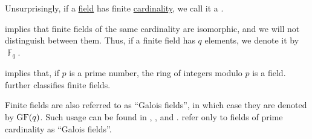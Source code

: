 \begin{definition}\label{def:finite_field}\mimprovised
  Unsurprisingly, if a \hyperref[def:field]{field} has finite \hyperref[thm:cardinality_existence]{cardinality}, we call it a .

   implies that finite fields of the same cardinality are isomorphic, and we will not distinguish between them. Thus, if a finite field has \( q \) elements, we denote it by \( \BbbF_q \).
\end{definition}
\begin{comments}
  \item {} implies that, if \( p \) is a prime number, the ring of integers modulo \( p \) is a field.  further classifies finite fields.

  \item Finite fields are also referred to as \enquote{Galois fields}, in which case they are denoted by \( \op{GF}(q) \). Such usage can be found in , ,  and .  refer only to fields of prime cardinality as \enquote{Galois fields}.
\end{comments}

